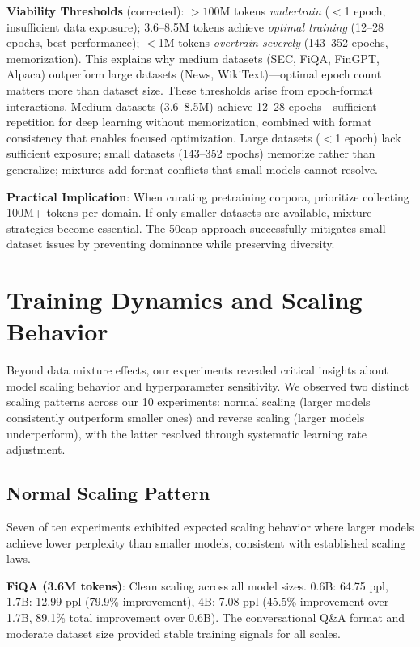 \textbf{Viability Thresholds} (corrected): \(>100\)M tokens \textit{undertrain} ($<$1 epoch, insufficient data exposure); 3.6–8.5M tokens achieve \textit{optimal training} (12–28 epochs, best performance); $<$1M tokens \textit{overtrain severely} (143–352 epochs, memorization). This explains why medium datasets (SEC, FiQA, FinGPT, Alpaca) outperform large datasets (News, WikiText)—optimal epoch count matters more than dataset size. These thresholds arise from epoch-format interactions. Medium datasets (3.6–8.5M) achieve 12–28 epochs—sufficient repetition for deep learning without memorization, combined with format consistency that enables focused optimization. Large datasets ($<$1 epoch) lack sufficient exposure; small datasets (143–352 epochs) memorize rather than generalize; mixtures add format conflicts that small models cannot resolve.

\textbf{Practical Implication}: When curating pretraining corpora, prioritize collecting 100M+ tokens per domain. If only smaller datasets are available, mixture strategies become essential. The 50cap approach successfully mitigates small dataset issues by preventing dominance while preserving diversity.

\section{Training Dynamics and Scaling Behavior}

Beyond data mixture effects, our experiments revealed critical insights about model scaling behavior and hyperparameter sensitivity. We observed two distinct scaling patterns across our 10 experiments: normal scaling (larger models consistently outperform smaller ones) and reverse scaling (larger models underperform), with the latter resolved through systematic learning rate adjustment.

\subsection{Normal Scaling Pattern}

Seven of ten experiments exhibited expected scaling behavior where larger models achieve lower perplexity than smaller models, consistent with established scaling laws.

\textbf{FiQA (3.6M tokens)}: Clean scaling across all model sizes. 0.6B: 64.75 ppl, 1.7B: 12.99 ppl (79.9\% improvement), 4B: 7.08 ppl (45.5\% improvement over 1.7B, 89.1\% total improvement over 0.6B). The conversational Q\&A format and moderate dataset size provided stable training signals for all scales.

